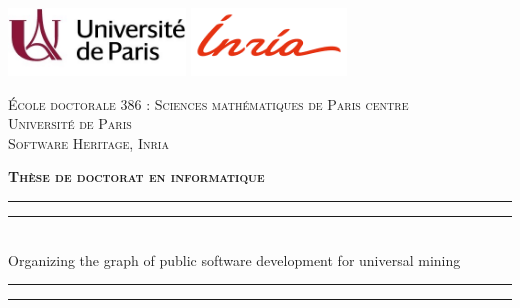 \begin{titlingpage}
\begin{SingleSpace}
\calccentering{\unitlength}

\includegraphics[height=1.8cm]{frontmatter/uni_paris.jpg}  \hfill
\includegraphics[height=1.8cm]{frontmatter/inria.png} \hfill
{}

\begin{center}

    \textsc{École doctorale 386 : Sciences mathématiques de Paris centre}\\
\vspace{2mm}
\textsc{Université de Paris}\\
\vspace{2mm}
\textsc{Software Heritage, Inria}\\

\vspace{4mm}

\textsc{\Large \textbf{Thèse de doctorat en informatique}}\\

\vspace*{2mm}

\rule[0.5ex]{\linewidth}{2pt}\vspace*{-\baselineskip}\vspace*{3.2pt}
\rule[0.5ex]{\linewidth}{1pt}\\[\baselineskip]
\vspace{-0.35cm}
{\huge Organizing the graph of public software development for universal mining}\\
\rule[0.5ex]{\linewidth}{1pt}\vspace*{-\baselineskip}\vspace*{3.4pt}
\rule[0.5ex]{\linewidth}{2pt}\\

\vspace{2mm}


\end{center}
\end{SingleSpace}
\end{titlingpage}
